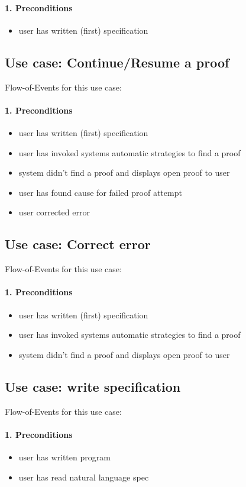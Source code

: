 \documentclass{article}
\begin{document}
\paragraph{1. Preconditions}
\begin{itemize}
 \item user has written (first) specification
\end{itemize}
\subsection{Use case: Continue/Resume a proof}
Flow-of-Events for this use case:
\paragraph{1. Preconditions}
\begin{itemize}
 \item user has written (first) specification
 \item user has invoked systems automatic strategies to find a proof
 \item system didn't find a proof and displays open proof to user
 \item user has found cause for failed proof attempt
 \item user corrected error
\end{itemize}
\subsection{Use case: Correct error}
Flow-of-Events for this use case:
\paragraph{1. Preconditions}
\begin{itemize}
 \item user has written (first) specification
  \item user has invoked systems automatic strategies to find a proof
 \item system didn't find a proof and displays open proof to user
\end{itemize}
\subsection{Use case: write specification}
Flow-of-Events for this use case:
\paragraph{1. Preconditions}
\begin{itemize}
 \item user has written program 
 \item user has read natural language spec
\end{itemize}
\end{document}
